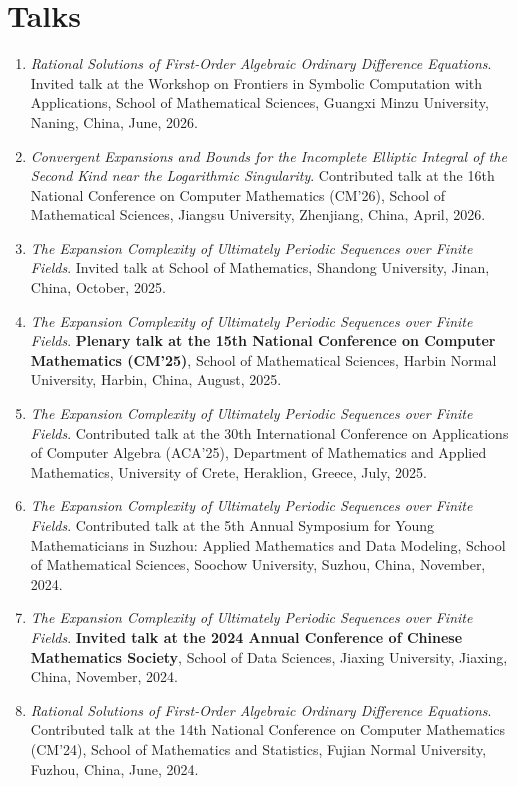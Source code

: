 \documentclass[a4paper,12pt]{article}
\begin{document}
\section*{\Large{Talks}}
\begin{enumerate}
\item {\em Rational Solutions of First-Order Algebraic Ordinary Difference Equations}. 
Invited talk at the Workshop on Frontiers in Symbolic Computation with Applications, 
School of Mathematical Sciences, Guangxi Minzu University, Naning, China, June, 2026.
\item {\em Convergent Expansions and Bounds for the Incomplete Elliptic Integral of the Second Kind near the Logarithmic Singularity}. 
Contributed talk at the 16th National Conference on Computer Mathematics (CM'26), School of Mathematical Sciences, Jiangsu University, Zhenjiang, China, April, 2026.
\item {\em The Expansion Complexity of Ultimately Periodic Sequences over Finite Fields}. 
Invited talk at School of Mathematics, Shandong University, Jinan, China, October, 2025. 
\item {\em The Expansion Complexity of Ultimately Periodic Sequences over Finite Fields}. 
\textbf{Plenary talk at the 15th National Conference on Computer Mathematics (CM'25)}, School of Mathematical Sciences, Harbin Normal University, Harbin, China, August, 2025.
\item {\em The Expansion Complexity of Ultimately Periodic Sequences over Finite Fields}. 
Contributed talk at the 30th International Conference on Applications of Computer Algebra (ACA'25), Department of Mathematics and Applied Mathematics, University of Crete, Heraklion, Greece, July, 2025.
\item {\em The Expansion Complexity of Ultimately Periodic Sequences over Finite Fields}. 
Contributed talk at the 5th Annual Symposium for Young Mathematicians in Suzhou: Applied Mathematics and Data Modeling, School of Mathematical Sciences, Soochow University, Suzhou, China, November, 2024.
\item {\em The Expansion Complexity of Ultimately Periodic Sequences over Finite Fields}. 
\textbf{Invited talk at the 2024 Annual Conference of Chinese Mathematics Society}, School of Data Sciences, Jiaxing University, Jiaxing, China, November, 2024.
\item {\em Rational Solutions of First-Order Algebraic Ordinary Difference Equations}. 
Contributed talk at the 14th National Conference on Computer Mathematics (CM'24), School of Mathematics and Statistics, Fujian Normal University, Fuzhou, China, June, 2024.

\end{enumerate}
\end{document}
